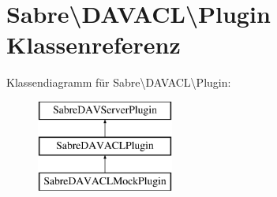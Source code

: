 \hypertarget{class_sabre_1_1_d_a_v_a_c_l_1_1_plugin}{}\section{Sabre\textbackslash{}D\+A\+V\+A\+CL\textbackslash{}Plugin Klassenreferenz}
\label{class_sabre_1_1_d_a_v_a_c_l_1_1_plugin}
Klassendiagramm für Sabre\textbackslash{}D\+A\+V\+A\+CL\textbackslash{}Plugin\+:\begin{figure}[H]
\begin{center}
\leavevmode
\includegraphics[height=3.000000cm]{class_sabre_1_1_d_a_v_a_c_l_1_1_plugin}
\end{center}
\end{figure}
